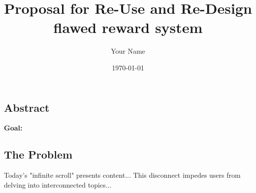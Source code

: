 \documentclass[11pt, a4paper]{article}
\begin{document}
    \title{\color{gitred}Proposal for Re-Use and Re-Design flawed reward system}
    \author{\color{gitgreen}Your Name}
    \date{\color{gitorange}\today}
    \maketitle

    \tableofcontents %
    \newpage %

    \begin{gitbox}
        \section*{Abstract}
        \textbf{Goal:}
    \end{gitbox}

    \begin{gitbox}[colframe=gitred]
        \section*{The Problem}
        Today's "infinite scroll" presents content... This disconnect impedes users from delving into interconnected topics...
    \end{gitbox}
\end{document}
